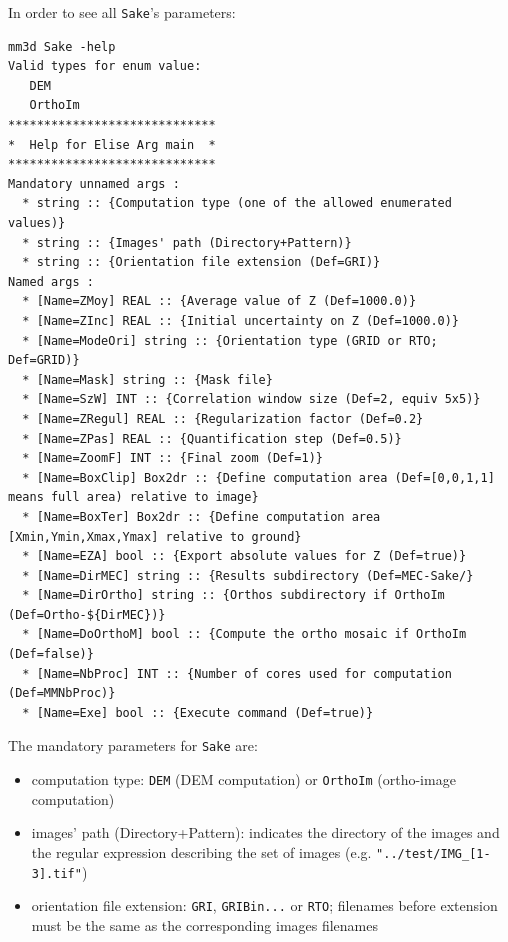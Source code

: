 \vspace{0.3cm}
In order to see all {\tt Sake}'s parameters:
\begin{verbatim}
mm3d Sake -help
Valid types for enum value:
   DEM
   OrthoIm
*****************************
*  Help for Elise Arg main  *
*****************************
Mandatory unnamed args :
  * string :: {Computation type (one of the allowed enumerated values)}
  * string :: {Images' path (Directory+Pattern)}
  * string :: {Orientation file extension (Def=GRI)}
Named args :
  * [Name=ZMoy] REAL :: {Average value of Z (Def=1000.0)}
  * [Name=ZInc] REAL :: {Initial uncertainty on Z (Def=1000.0)}
  * [Name=ModeOri] string :: {Orientation type (GRID or RTO; Def=GRID)}
  * [Name=Mask] string :: {Mask file}
  * [Name=SzW] INT :: {Correlation window size (Def=2, equiv 5x5)}
  * [Name=ZRegul] REAL :: {Regularization factor (Def=0.2}
  * [Name=ZPas] REAL :: {Quantification step (Def=0.5)}
  * [Name=ZoomF] INT :: {Final zoom (Def=1)}
  * [Name=BoxClip] Box2dr :: {Define computation area (Def=[0,0,1,1] means full area) relative to image}
  * [Name=BoxTer] Box2dr :: {Define computation area [Xmin,Ymin,Xmax,Ymax] relative to ground}
  * [Name=EZA] bool :: {Export absolute values for Z (Def=true)}
  * [Name=DirMEC] string :: {Results subdirectory (Def=MEC-Sake/}
  * [Name=DirOrtho] string :: {Orthos subdirectory if OrthoIm (Def=Ortho-${DirMEC})}
  * [Name=DoOrthoM] bool :: {Compute the ortho mosaic if OrthoIm (Def=false)}
  * [Name=NbProc] INT :: {Number of cores used for computation (Def=MMNbProc)}
  * [Name=Exe] bool :: {Execute command (Def=true)}
\end{verbatim}

The mandatory parameters for {\tt Sake} are:
\begin{itemize}
  \item computation type: {\tt DEM} (DEM computation) or {\tt OrthoIm} (ortho-image computation)
  \item images' path (Directory+Pattern): indicates the directory of the images and the regular expression describing the set of images (e.g. {\tt "../test/IMG\_[1-3].tif"})
  \item orientation file extension: {\tt GRI}, {\tt GRIBin...} or {\tt RTO}; filenames before extension must be the same as the corresponding images filenames
\end{itemize}

